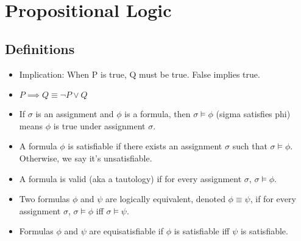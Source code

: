 \documentclass{article}
\begin{document}
\section*{Propositional Logic}
\subsection{Definitions}

\begin{itemize}
\item Implication: When P is true, Q must be true. False implies true.
\item $P \implies Q \equiv \neg P \lor Q$
\item If $\sigma$ is an assignment and $\phi$ is a formula, then $\sigma \models \phi$ (sigma satisfies phi) means $\phi$ is true under assignment $\sigma$.
\item A formula $\phi$ is satisfiable if there exists an assignment $\sigma$ such that $\sigma \models \phi$. Otherwise, we say it's unsatisfiable.
\item A formula is valid (aka a tautology) if for every assignment $\sigma$, $\sigma \models \phi$.
\item Two formulas $\phi$ and $\psi$ are logically equivalent, denoted $\phi \equiv \psi$, if for every assignment $\sigma$, $\sigma \models \phi$ iff $\sigma \models \psi$.
\item Formulas $\phi$ and $\psi$ are equisatisfiable if $\phi$ is satisfiable iff $\psi$ is satisfiable.
\end{itemize}
\end{document}
